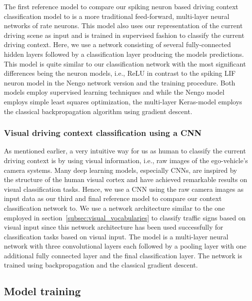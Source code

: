 The first reference model to compare our spiking neuron based driving context classification model to is a more traditional feed-forward, multi-layer neural networks of rate neurons.
This model also uses our representation of the current driving scene as input and is trained in supervised fashion to classify the current driving context.
Here, we use a network consisting of several fully-connected hidden layers followed by a classification layer producing the models predictions.
This model is quite similar to our classification network with the most significant differences being the neuron models, i.e., \ac{ReLU} in contrast to the spiking \ac{LIF} neuron model in the \ac{Nengo} network version and the training procedure.
Both models employ supervised learning techniques and while the \ac{Nengo} model employs simple least squares optimization, the multi-layer Keras-model employs the classical backpropagation algorithm using gradient descent.

\subsubsection{Visual driving context classification using a \acs{CNN}}%
\label{ssubsec:visual_classification_using_cnn}

As mentioned earlier, a very intuitive way for us as human to classify the current driving context is by using visual information, i.e., raw images of the ego-vehicle's camera systems.
Many deep learning models, especially \acp{CNN}, are inspired by the structure of the human visual cortex and have achieved remarkable results on visual classification tasks.
Hence, we use a \ac{CNN} using the raw camera images as input data as our third and final reference model to compare our context classification network to.
We use a network architecture similar to the one employed in section~\ref{subsec:visual_vocabularies} to classify traffic signs based on visual input since this network architecture has been used successfully for classification tasks based on visual input.
The model is a multi-layer neural network with three convolutional layers each followed by a pooling layer with one additional fully connected layer and the final classification layer.
The network is trained using backpropagation and the classical gradient descent.

\subsection{Model training}%
\label{subsec:model_training}

